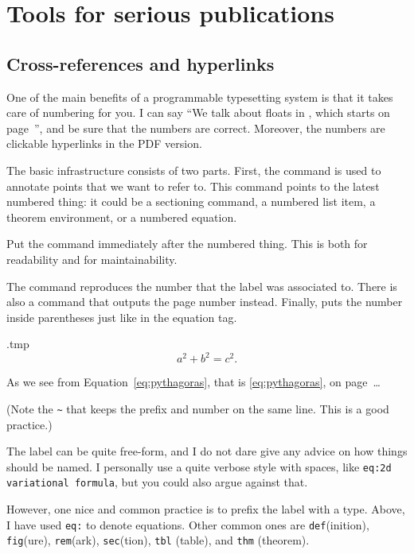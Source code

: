 \chapter{Tools for serious publications}

\section{Cross-references and hyperlinks}\label{sec:crossref}

One of the main benefits of a programmable typesetting system is
that it takes care of numbering for you.
I can say ``We talk about floats in , which starts on page~\pageref{sec:floats}'',
and be sure that the numbers are correct.
Moreover, the numbers are clickable hyperlinks in the PDF version.

The basic infrastructure consists of two parts.
First, the  command is used to annotate points that we want to refer to.
This command points to the latest numbered thing:
it could be a sectioning command, a numbered list item, a theorem environment,
or a numbered equation.

\begin{practices}
Put the  command immediately after the numbered thing.
This is both for readability and for maintainability.
\end{practices}

The  command reproduces the number that the label was associated to.
There is also a  command that outputs the page number instead.
Finally,  puts the number inside parentheses just like in the equation tag.
%
\begin{VerbatimOut}{\jobname.tmp}
\begin{equation}\label{eq:pythagoras}
  a^2 + b^2 = c^2.
\end{equation}

As we see from Equation~\ref{eq:pythagoras},
that is \eqref{eq:pythagoras},
on page~\pageref{eq:pythagoras}\dots
\end{VerbatimOut}
\ShowExample
%
(Note the \verb|~| that keeps the prefix and number on the same line.
This is a good practice.)

\begin{practices}
The label can be quite free-form,
and I do not dare give any advice on how things should be named.
I personally use a quite verbose style with spaces,
like \texttt{eq:2d variational formula},
but you could also argue against that.

However, one nice and common practice is to prefix the label with a type.
Above, I have used \verb|eq:| to denote equations.
Other common ones are
\verb|def|(inition), \verb|fig|(ure), \verb|rem|(ark), \verb|sec|(tion),
\verb|tbl| (table), and \verb|thm| (theorem).
\end{practices}

